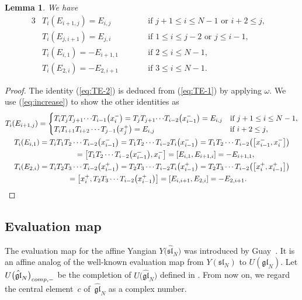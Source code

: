 \documentclass[11pt]{article}
\newtheorem{lem}[thm]{Lemma}
\theoremstyle{definition}
\numberwithin{equation}{section}
\newcommand{\affY}{Y\big(\affsl\big)}
\newcommand{\gl}{\mathfrak{gl}}
\newcommand{\fraksl}{\mathfrak{sl}}
\newcommand{\affsl}{\hat{\mathfrak{sl}}_N}
\begin{document}
\begin{lem}We have
\begin{alignat}{3}
&T_i(E_{i+1,j})= E_{i,j} \qquad && \text{if $j+1 \leq i \leq N-1$ \ or \ $i+2 \leq j$}, & \label{eq:TE-1}\\
&T_i(E_{j,i+1})= E_{j,i} \qquad &&\text{if $1 \leq i \leq j-2$ \ or \ $j \leq i-1$}, & \label{eq:TE-2}\\
&T_i(E_{i,1})= -E_{i+1,1} \qquad &&\text{if $2 \leq i \leq N-1$}, & \label{eq:TE-3}\\
&T_i(E_{2,i})= -E_{2,i+1} \qquad &&\text{if $3 \leq i \leq N-1$}. & \label{eq:TE-4}
\end{alignat}
\end{lem}
\begin{proof}The identity (\ref{eq:TE-2}) is deduced from (\ref{eq:TE-1}) by applying $\omega$. We use (\ref{eq:increase}) to show the other identities as
\begin{gather*}
T_i(E_{i+1,j}) = \begin{cases}
T_i T_j T_{j+1} {\cdots} T_{i-1}\big(x_i^-\big) = T_j T_{j+1} {\cdots} T_{i-2} \big(x_{i-1}^-\big) = E_{i,j} &\text{if $j+1 \leq i \leq N-1$}, \\
T_i T_{i+1} T_{i+2} \cdots T_{j-1}\big(x_j^+\big) = E_{i,j} & \text{if $i+2 \leq j$},
\end{cases}
\\
T_i(E_{i,1}) = T_i T_{1} T_{2} \cdots T_{i-2}\big(x_{i-1}^-\big) = T_{1} T_{2} \cdots T_{i-2} T_i \big(x_{i-1}^-\big)= T_{1} T_{2} \cdots T_{i-2} \big(\big[x_{i-1}^-,x_i^-\big]\big)\\
\hphantom{T_i(E_{i,1})}{} = \big[T_{1} T_{2} \cdots T_{i-2} \big(x_{i-1}^-\big),x_i^-\big] = [E_{i,1}, E_{i+1,i}] = -E_{i+1,1},\\
T_i(E_{2,i}) = T_i T_{2} T_{3} \cdots T_{i-2}\big(x_{i-1}^+\big) = T_{2} T_{3} \cdots T_{i-2} T_i \big(x_{i-1}^+\big) = T_{2} T_{3} \cdots T_{i-2} \big(\big[x_{i}^+,x_{i-1}^+\big]\big)\\
\hphantom{T_i(E_{2,i})}{} = \big[x_i^+, T_{2} T_{3} \cdots T_{i-2} \big(x_{i-1}^+\big)\big] = [E_{i,i+1}, E_{2,i}] = -E_{2,i+1}.\tag*{\qed}
\end{gather*}\renewcommand{\qed}{}
\end{proof}

\subsection{Evaluation map}

The evaluation map for the affine Yangian $\affY$ was introduced by Guay~\cite{MR2323534}. It is an affine analog of the well-known evaluation map from $Y(\fraksl_N)$ to $U(\gl_N)$. Let $U\big(\hat{\gl}_N\big)_{{\rm comp},-}$ be the completion of ${U}\big(\hat{\gl}_N\big)$ defined in \cite[Definition~2.5]{kodera_evaluation}. From now on, we regard the central element~$c$ of~$\hat{\gl}_N$ as a complex number.
\end{document}

